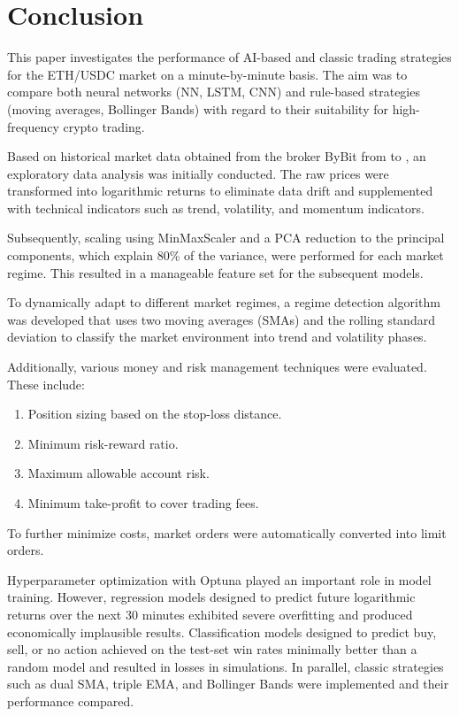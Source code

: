 \section{Conclusion}
\label{chap:conclusion}

This paper investigates the performance of AI-based and classic trading strategies for the ETH/USDC market on a minute-by-minute basis.
The aim was to compare both neural networks (NN, LSTM, CNN) and rule-based strategies (moving averages, Bollinger Bands) with regard to their suitability for high-frequency crypto trading.

Based on historical market data obtained from the broker ByBit from \ethDataStartDate to \ethDataEndDate, an exploratory data analysis was initially conducted.
The raw prices were transformed into logarithmic returns to eliminate data drift and supplemented with technical indicators such as trend, volatility, and momentum indicators.

Subsequently, scaling using MinMaxScaler and a PCA reduction to the principal components, which explain 80\% of the variance, were performed for each market regime.
This resulted in a manageable feature set for the subsequent models.

To dynamically adapt to different market regimes, a regime detection algorithm was developed that uses two moving averages (SMAs) and the rolling standard deviation to classify the market environment into trend and volatility phases.

Additionally, various money and risk management techniques were evaluated.
These include:

\begin{enumerate}
    \item Position sizing based on the stop-loss distance.
    \item Minimum risk-reward ratio.
    \item Maximum allowable account risk.
    \item Minimum take-profit to cover trading fees.
\end{enumerate}

\noindent
To further minimize costs, market orders were automatically converted into limit orders.

Hyperparameter optimization with Optuna played an important role in model training.
However, regression models designed to predict future logarithmic returns over the next 30 minutes exhibited severe overfitting and produced economically implausible results.
Classification models designed to predict buy, sell, or no action achieved on the test-set win rates minimally better than a random model and resulted in losses in simulations.
In parallel, classic strategies such as dual SMA, triple EMA, and Bollinger Bands were implemented and their performance compared.


